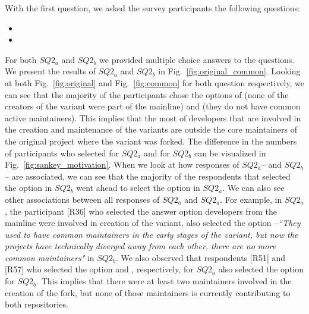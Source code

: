 With the first question, we asked the survey participants the following questions:

\begin{itemize}
\item  \rqTwoOne
\item \rqTwoTwo
\end{itemize}


For both $SQ2_{a}$ and $SQ2_{b}$ we provided multiple choice answers to the questions. We present the results of $SQ2_{a}$ and $SQ2_{b}$ in Fig.~\ref{fig:original_common}. Looking at both Fig.~\ref{fig:original} and Fig.~\ref{fig:common} for both question respectively, we can see that the majority of the participants chose the options of  (none of the creators of the variant were part of the mainline) and  (they do not have common active maintainers).
This implies that the most of developers that are involved in the creation and maintenance of the variants are outside the core maintainers of the original project where the variant was forked.
The difference in the numbers of participants who selected   for $SQ2_{a}$ and  for $SQ2_{b}$ can be visualized in Fig.~\ref{fig:sankey_motivation}.
When we look at how responses of $SQ2_{a}$-- and $SQ2_{b}$-- are associated, we can see that the majority of the respondents that selected the option  in $SQ2_{b}$ went ahead to select the option  in $SQ2_{a}$. We can also see other associations between all responses of $SQ2_{a}$ and $SQ2_{a}$.
For example, in $SQ2_{a}$, the participant [R36] who selected the answer option  developers from the mainline were involved in creation of the variant, also selected the option --\emph{``They used to have common maintainers in the early stages of the variant, but now the projects have technically diverged away from each other, there are no more common maintainers"} in $SQ2_{b}$.
We also observed that respondents [R51] and [R57] who selected the option  and , respectively, for $SQ2_{a}$ also selected the option  for $SQ2_{b}$. This implies that there were at least two maintainers involved in the creation of the fork, but none of those maintainers is currently contributing to both repositories.



